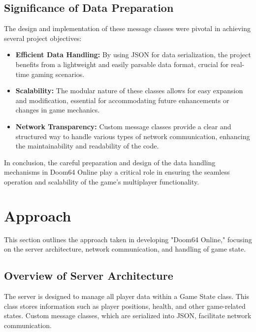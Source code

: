 \subsection{Significance of Data Preparation}
The design and implementation of these message classes were pivotal in achieving several project objectives:
\begin{itemize}
\item \textbf{Efficient Data Handling:} By using JSON for data serialization, the project benefits from a lightweight and easily parsable data format, crucial for real-time gaming scenarios.
\item \textbf{Scalability:} The modular nature of these classes allows for easy expansion and modification, essential for accommodating future enhancements or changes in game mechanics.
\item \textbf{Network Transparency:} Custom message classes provide a clear and structured way to handle various types of network communication, enhancing the maintainability and readability of the code.
\end{itemize}

In conclusion, the careful preparation and design of the data handling mechanisms in Doom64 Online play a critical role in ensuring the seamless operation and scalability of the game's multiplayer functionality.


\section{Approach}
\label{chap:approach}

This section outlines the approach taken in developing "Doom64 Online," focusing on the server architecture, network communication, and handling of game state.

\subsection{Overview of Server Architecture}
The server is designed to manage all player data within a Game State class. This class stores information such as player positions, health, and other game-related states. Custom message classes, which are serialized into JSON, facilitate network communication.

